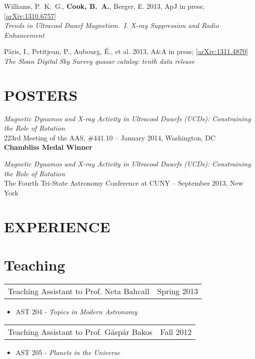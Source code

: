 \documentclass[margin]{res}
\begin{document}
\begin{resume}
Williams, P.~K.~G., \textbf{Cook, B.~A.}, Berger, E. 2013,
ApJ in press; [\href{http://arxiv.org/abs/1310.6757}{arXiv:1310.6757}]\\ \textit{Trends in Ultracool
  Dwarf Magnetism.~I. X-ray Suppression and Radio Enhancement}

P\^{a}ris, I., Petitjean, P., Aubourg, \'E., et al. 2013, A\&A in
press; [\href{http://arxiv.org/abs/1311.4870}{arXiv:1311.4870}]\\ \textit{The Sloan Digital Sky Survey quasar catalog: tenth
  data release}

\section{POSTERS}

\textit{Magnetic Dynamos and X-ray Activity in Ultracool Dwarfs (UCDs):
Constraining the Role of Rotation}\\ 223rd Meeting of the AAS, \#441.10 -- January 2014, Washington, DC \\
\textbf{Chambliss Medal Winner}

\textit{Magnetic Dynamos and X-ray Activity in Ultracool Dwarfs (UCDs):
Constraining the Role of Rotation}\\ The Fourth Tri-State Astronomy
Conference at CUNY -- September 2013, New York

\section{EXPERIENCE}      
\normalsize{\section{Teaching}}
				 \begin{tabular}{@{}p{4in} r}
				 Teaching Assistant to Prof. Neta
                                 Bahcall & Spring 2013
				 \end{tabular}
				 \begin{itemize}
				 \item[] AST 204 - \textit{Topics in
                                   Modern Astronomy}
				 \end{itemize}
				 
				 \begin{tabular}{@{}p{4in} r}
				 Teaching Assistant to
                                 Prof. G\'asp\'ar Bakos & Fall 2012
				 \end{tabular}
				 \begin{itemize}
				 \item[] AST 205 - \textit{Planets in
                                   the Universe}
				 \end{itemize}


\end{resume}
\end{document}
